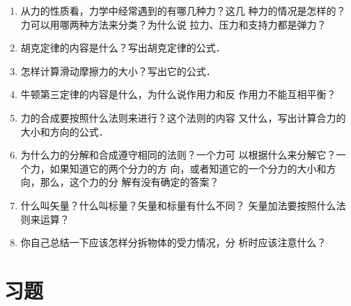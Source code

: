 \begin{enumerate} 
\item 从力的性质看，力学中经常遇到的有哪几种力？这几
种力的情况是怎样的？力可以用哪两种方法来分类？为什么说
拉力、压力和支持力都是弹力？
\item
胡克定律的内容是什么？写出胡克定律的公式．
\item
怎样计算滑动摩擦力的大小？写出它的公式．
\item 牛顿第三定律的内容是什么，为什么说作用力和反
作用力不能互相平衡？
\item
力的合成要按照什么法则来进行？这个法则的内容
又什么，写出计算合力的大小和方向的公式．
\item
为什么力的分解和合成遵守相同的法则？一个力可
以根据什么来分解它？一个力，如果知道它的两个分力的方
向，或者知道它的一个分力的大小和方向，那么，这个力的分
解有没有确定的答案？
\item
什么叫矢量？什么叫标量？矢量和标量有什么不同？
矢量加法要按照什么法则来运算？
\item
你自己总结一下应该怎样分拆物体的受力情况，分
析时应该注意什么？
\end{enumerate} 

\section*{习题} 

